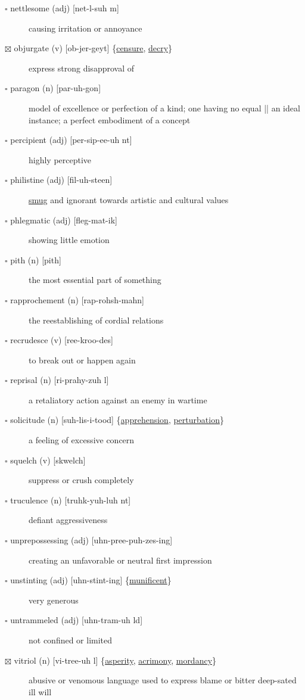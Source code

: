 \documentclass[11pt]{article}
\begin{document}
\begin{description}
\item[{$\square$ nettlesome (adj) [net-l-suh m]}] causing irritation or annoyance
\item[{$\boxtimes$ \label{orgd45e5c5}objurgate (v) [ob-jer-geyt] \{\hyperref[orge8a51e2]{censure}, \hyperref[org7e8d517]{decry}\}}] express strong disapproval of
\item[{$\square$ paragon (n) [par-uh-gon]}] model of excellence or perfection of a kind; one having no equal || an ideal instance; a perfect embodiment of a concept
\item[{$\square$ percipient (adj) [per-sip-ee-uh nt]}] highly perceptive
\item[{$\square$ philistine (adj) [fil-uh-steen]}] \hyperref[org1873ccf]{smug} and ignorant towards artistic and cultural values
\item[{$\square$ \label{orgc64d99a} \label{org1424a13}phlegmatic (adj) [fleg-mat-ik]}] showing little emotion
\item[{$\square$ pith (n) [pith]}] the most essential part of something
\item[{$\square$ rapprochement (n) [rap-rohsh-mahn]}] the reestablishing of cordial relations
\item[{$\square$ recrudesce (v) [ree-kroo-des]}] to break out or happen again
\item[{$\square$ reprisal (n) [ri-prahy-zuh l]}] a retaliatory action against an enemy in wartime
\item[{$\square$ \label{org0889008}solicitude (n) [suh-lis-i-tood] \{\hyperref[org85469d5]{apprehension}, \hyperref[orgd8eddee]{perturbation}\}}] a feeling of excessive concern
\item[{$\square$ squelch (v) [skwelch]}] suppress or crush completely
\item[{$\square$ truculence (n) [truhk-yuh-luh nt]}] defiant aggressiveness
\item[{$\square$ unprepossessing (adj) [uhn-pree-puh-zes-ing]}] creating an unfavorable or neutral first impression
\item[{$\square$ \label{org2c60d44}unstinting (adj) [uhn-stint-ing] \{\hyperref[org151f55a]{munificent}\}}] very generous
\item[{$\square$ untrammeled (adj) [uhn-tram-uh ld]}] not confined or limited
\item[{$\boxtimes$ \label{org7cc1ee9}vitriol (n) [vi-tree-uh l] \{\hyperref[org05c04a3]{asperity}, \hyperref[orgd57c0d6]{acrimony}, \hyperref[org0780d5c]{mordancy}\}}] abusive or venomous language used to express blame or bitter deep-sated ill will
\end{description}
\end{document}
